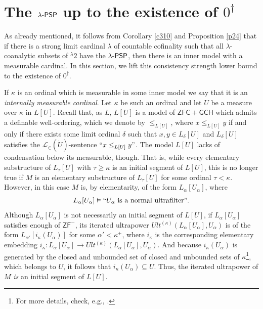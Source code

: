 \documentclass{amsart}
\numberwithin{equation}{section}
\def\hyp{{\hbox{-}}}
\theoremstyle{definition}
\theoremstyle{remark}
\begin{document}
\section{The $\lambda\hyp\mathsf{PSP}$ up to the existence of $0^{\dagger}$}\label{section:0-dagger}

As already mentioned, it follows from Corollary \ref{c310} and Proposition \ref{p24} that if there is a strong limit cardinal $\lambda$ of countable cofinality such that all $\lambda$-coanalytic subsets of ${}^{\lambda}2$ have the $\lambda\hyp\mathsf{PSP}$, then there is an inner model with a measurable cardinal. In this section, we lift this consistency strength lower bound to the existence of $0^\dagger$. 

If $\kappa$ is an ordinal which is measurable in some inner model we say that it is an \emph{internally measurable cardinal}. 
Let $\kappa$ be such an ordinal and let $U$ be a measure over $\kappa$ in $L[U]$. Recall that, as $L$, $L[U]$ is a model of $\mathsf{ZFC+GCH}$ which admits a definable well-ordering, which we denote by $\leq_{L[U]}$, where $x\leq_{L[U]}y$ if and only if there exists some limit ordinal $\delta$ such that $x,y\in L_{\delta}[U]$ and $L_{\delta}[U]$ satisfies the $\mathcal{L}_{\in}(\dot{U})$-sentence $``x\leq_{L[U]}y"$.
The model $L[U]$ lacks of condensation below its measurable, though. That is, while every elementary substructure of $L_\tau[U]$ with $\tau\geq\kappa$ is an initial segment of $L[U]$, this is no longer true if $M$ is an elementary substructure of $L_{\tau}[U]$ for some ordinal $\tau<\kappa$. However, in this case $M$ is, by elementarity, of the form $L_{\alpha}[U_{\alpha}]$, where $$L_{\alpha}[U_{\alpha}]\vDash``U_{\alpha}\text{ is a normal ultrafilter}".$$ Although $L_{\alpha}[U_{\alpha}]$ is not necessarily an initial segment of $L[U]$,  if $L_{\alpha}[U_{\alpha}]$ satisfies enough of $\mathsf{ZF^{-}}$, its iterated ultrapower $Ult^{(\kappa)}(L_{\alpha}[U_{\alpha}],U_{\alpha})$ is of the form $L_{\alpha'}[i_{\kappa}(U_{\alpha})]$ for some $\alpha'<\kappa^{+}$, where $i_{\kappa}$ is the corresponding elementary embedding $i_{\kappa}:L_{\alpha}[U_{\alpha}]\to Ult^{(\kappa)}(L_{\alpha}[U_{\alpha}],U_{\alpha})$. And because $i_{\kappa}(U_{\alpha})$ is generated by the closed and unbounded set of closed and unbounded sets of $\kappa$\footnote{For more details, check, e.g., \cite[Theorem 1.11]{mitchell2009beginning}.}, which belongs to $U$, it follows that $i_{\kappa}(U_{\alpha})\subseteq U$. Thus, the iterated ultrapower of $M$  \emph{is} an initial segment of $L[U]$. 
\end{document}
